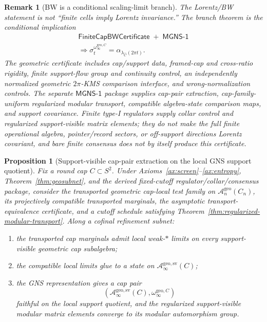 \documentclass[11pt]{article}
\newtheorem{proposition}[theorem]{Proposition}
\newtheorem{remark}[theorem]{Remark}
\begin{document}
\begin{remark}[BW is a conditional scaling-limit branch]\label{rem:bw-conditional-branch}
The Lorentz/BW statement is not ``finite cells imply Lorentz invariance.''  The branch theorem is
the conditional implication
\[
\begin{gathered}
\mathsf{FiniteCapBWCertificate}
\;+\;\mathsf{MGNS\text{-}1}\\
\Longrightarrow
\sigma_t^{\omega_\infty^{\mathrm{geo},C}}
=
\alpha_{\lambda_{\widehat C}(2\pi t)} .
\end{gathered}
\]
The geometric certificate includes cap/support data, framed-cap and cross-ratio rigidity,
finite support-flow group and continuity control, an independently normalized geometric
\(2\pi\)-KMS comparison interface, and wrong-normalization controls. The separate
\(\mathsf{MGNS\text{-}1}\) package supplies cap-pair extraction, cap-family-uniform regularized
modular transport, compatible algebra-state comparison maps, and support covariance. Finite type-I
regulators supply collar control and regularized support-visible matrix elements; they do not make
the full finite operational algebra, pointer/record sectors, or off-support directions Lorentz
covariant, and bare finite consensus does not by itself produce this certificate.
\end{remark}

\begin{proposition}[Support-visible cap-pair extraction on the local GNS support quotient]\label{prop:cap-pair-extraction}
Fix a round cap \(C\subset S^2\). Under Axioms~\ref{ax:screen}--\ref{ax:entropy}, Theorem~\ref{thm:geosubnet}, and the derived fixed-cutoff regulator/collar/consensus package, consider the transported geometric cap-local test family on \(\mathcal A_n^{\mathrm{geo}}(C_n)\), its projectively compatible transported marginals, the asymptotic transport-equivalence certificate, and a cutoff schedule satisfying Theorem~\ref{thm:regularized-modular-transport}. Along a cofinal refinement subnet:
\begin{enumerate}[label=\textup{(\roman*)},leftmargin=2em]
\item the transported cap marginals admit local weak-\(*\) limits on every support-visible geometric cap subalgebra;
\item the compatible local limits glue to a state on \(\mathcal A_\infty^{\mathrm{geo,sv}}(C)\);
\item the GNS representation gives a cap pair
\[
(\mathcal A_\infty^{\mathrm{geo,sv}}(C),\omega_\infty^{\mathrm{geo},C})
\]
faithful on the local support quotient, and the regularized support-visible modular matrix elements converge to its modular automorphism group.
\end{enumerate}
\end{proposition}
\end{document}
